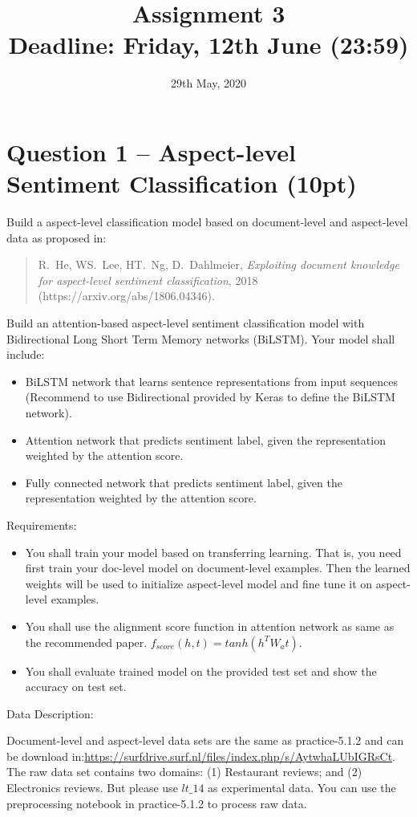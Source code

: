 \documentclass[a4paper,twoside,10pt]{article}
\title{\vspace{-\baselineskip}\sffamily\bfseries Assignment 3 \\
	\large Deadline: Friday, 12th June (23:59)}
\date{29th May, 2020}
\begin{document}
	\maketitle
	


\section*{Question 1 -- Aspect-level Sentiment Classification (10pt)}

Build a aspect-level classification model based on document-level and aspect-level data as proposed in:

\begin{quote}
R.~He, WS.~Lee, HT.~Ng, D.~Dahlmeier, \textit{Exploiting document knowledge for aspect-level sentiment classification},  2018 (https://arxiv.org/abs/1806.04346).
\end{quote}

\noindent
Build an attention-based aspect-level sentiment classification model with Bidirectional Long Short Term Memory networks (BiLSTM).
Your model shall include:
\begin{itemize}
    \item BiLSTM network that learns sentence representations from input sequences (Recommend to use Bidirectional provided by Keras to define the BiLSTM network).
    \item Attention network that predicts sentiment label, given the representation weighted by the attention score.
    \item Fully connected network that predicts sentiment label, given the representation weighted by the attention score.
\end{itemize}
Requirements:
\begin{itemize}
    \item You shall train your model based on transferring learning. That is, you need first train your doc-level model on document-level examples. Then the learned weights will be used to initialize aspect-level model and fine tune it on aspect-level examples. 
    \item You shall use the alignment score function in attention network as same as the recommended paper. $f_{score}(h,t) =tanh(h^T W_a t)$.
    \item You shall evaluate trained model on the provided test set and show the accuracy on test set.
\end{itemize}
Data Description:

Document-level and aspect-level data sets are the same as practice-5.1.2 and can be download in:\url{https://surfdrive.surf.nl/files/index.php/s/AytwhaLUbIGRsCt}.
The raw data set contains two domains: (1) Restaurant reviews; and (2) Electronics reviews. But please use $lt\_14$ as experimental data. You can use the preprocessing notebook in practice-5.1.2 to process raw data. 
\end{document}
